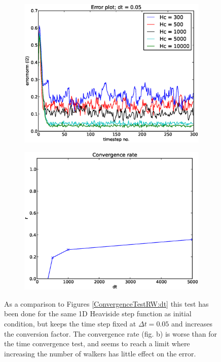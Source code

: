 \begin{figure}[H]
 \centering
 \begin{subfigure}[t]{0.48\textwidth}
  \includegraphics[width=\textwidth]{../doc/results/experiment_02052014_0747_Redoing_RW_tests_Hc/results/errorplot.eps}
 \end{subfigure}
\begin{subfigure}[t]{0.48\textwidth}
 \includegraphics[width=\textwidth]{../doc/results/experiment_02052014_0747_Redoing_RW_tests_Hc/results/ConvergenceTest.eps}
\end{subfigure}
\caption[Test RW]{As a comparison to Figures \ref{ConvergenceTestRW:dt} this test has been done for the same 1D Heaviside step function as initial condition, but keeps the time step fixed at $\Delta t = 0.05$ and increases the conversion factor. The convergence rate (fig. b) is worse than for the time convergence test, and seems to reach a limit where increasing the number of walkers has little effect on the error.}
\label{ConvergenceTestRW:Hc}
\end{figure}




